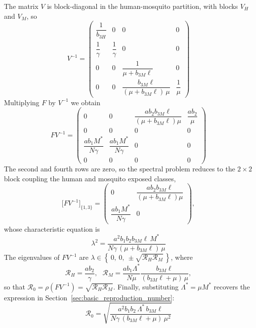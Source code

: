 \documentclass[a4paper,fleqn]{cas-dc}
\begin{document}
The matrix $V$ is block-diagonal in the human-mosquito partition, with blocks $V_H$ and $V_M$, so
$$
V^{-1} = \begin{pmatrix}
\dfrac{1}{b_{3H}} & 0 & 0 & 0 \\[2mm]
\dfrac{1}{\gamma} & \dfrac{1}{\gamma} & 0 & 0 \\[2mm]
0 & 0 & \dfrac{1}{\mu + b_{3M}\ell} & 0 \\[2mm]
0 & 0 & \dfrac{b_{3M}\ell}{(\mu + b_{3M}\ell)\,\mu} & \dfrac{1}{\mu}
\end{pmatrix}
$$
Multiplying $F$ by $V^{-1}$ we obtain
$$
FV^{-1} = \begin{pmatrix}
0 & 0 & \dfrac{a b_2 b_{3M}\ell}{(\mu+b_{3M}\ell)\mu} & \dfrac{a b_2}{\mu} \\[2mm]
0 & 0 & 0 & 0 \\[2mm]
\dfrac{a b_1 M^*}{N\gamma} & \dfrac{a b_1 M^*}{N\gamma} & 0 & 0 \\[2mm]
0 & 0 & 0 & 0
\end{pmatrix}
$$
The second and fourth rows are zero, so the spectral problem reduces to
the $2\times2$ block coupling the human and mosquito exposed classes,
$$
\big[FV^{-1}\big]_{\{1,3\}} =
\begin{pmatrix}
0 & \dfrac{a b_2 b_{3M}\ell}{(\mu + b_{3M}\ell)\mu} \\[2mm]
\dfrac{a b_1 M^*}{N\gamma} & 0
\end{pmatrix},
$$
whose characteristic equation is
$$
\lambda^2 =
\frac{a^2 b_1 b_2 b_{3M}\ell\, M^*}{N\gamma\,(\mu + b_{3M}\ell)\,\mu}
$$
The eigenvalues of $FV^{-1}$ are
$
\lambda \in \left\{\, 0,\ 0,\ \pm\sqrt{\mathcal{R}_H \mathcal{R}_M}\,\right\}$, where
$$\mathcal{R}_H = \frac{a b_2}{\gamma},
\ \ \ 
\mathcal{R}_M = \frac{a b_1 \Lambda^*}{N\mu}
\frac{b_{3M}\ell}{(b_{3M}\ell + \mu)\,\mu},
$$
so that $\mathcal{R}_0 = \rho(FV^{-1}) = \sqrt{\mathcal{R}_H \mathcal{R}_M}$.
Finally, substituting $\Lambda^* = \mu M^*$ recovers the expression in
Section~\ref{sec:basic_reproduction_number}:
\begin{equation}\label{eq:R0_appendix}
\mathcal{R}_0 =
\sqrt{\frac{a^2 b_1 b_2\, \Lambda^*\, b_{3M}\ell}
{N\gamma\,(b_{3M}\ell + \mu)\,\mu^2}} 
\end{equation}





\printcredits

%





\end{document}
